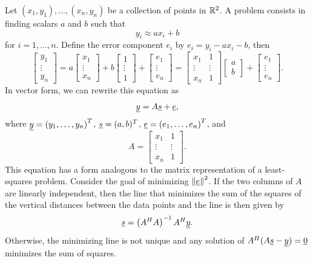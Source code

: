 Let $(x_1, y_1), \ldots, (x_n, y_n)$ be a collection of points in $\mathbb{R}^2$.
A  problem consists in finding scalars $a$ and $b$ such that
\begin{equation*}
y_i \approx a x_i + b
\end{equation*}
for $i = 1, \ldots, n$.
Define the error component $e_i$ by $e_i = y_i - a x_i - b$, then
\begin{equation*}
\begin{bmatrix} y_1 \\ \vdots \\ y_n \end{bmatrix}
= a \begin{bmatrix} x_1 \\ \vdots \\ x_n \end{bmatrix}
+ b \begin{bmatrix} 1 \\ \vdots \\ 1 \end{bmatrix}
+ \begin{bmatrix} e_1 \\ \vdots \\ e_n \end{bmatrix}
= \begin{bmatrix} x_1 & 1 \\ \vdots & \vdots \\ x_n & 1 \end{bmatrix}
\begin{bmatrix} a \\ b \end{bmatrix}
+ \begin{bmatrix} e_1 \\ \vdots \\ e_n \end{bmatrix} .
\end{equation*}
In vector form, we can rewrite this equation as
\begin{equation*}
\underline{y} = A \underline{s} + \underline{e},
\end{equation*}
where $\underline{y} = \left( y_1, \ldots, y_n \right)^T$, $\underline{s} = (a, b)^T$, $\underline{e} = \left( e_1, \ldots, e_n \right)^T$, and
\begin{equation*}
A = \begin{bmatrix} x_1 & 1 \\
\vdots & \vdots \\ x_n & 1 \end{bmatrix} .
\end{equation*}
This equation has a form analogous to the matrix representation of a least-squares problem.
Consider the goal of minimizing $\left\| \underline{e} \right\|^2$.
If the two columns of $A$ are linearly independent, then the line that minimizes the sum of the squares of the vertical distances between the data points and the line is then given by
\begin{equation*}
\underline{s} = \left( A^H A \right)^{-1} A^H \underline{y}.
\end{equation*}
Otherwise, the minimizing line is not unique and any solution of $A^H (A \underline{s}-\underline{y})=\underline{0}$ minimizes the sum of squares.


